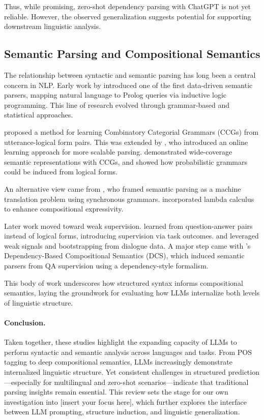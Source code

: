 Thus, while promising, zero-shot dependency parsing with ChatGPT is not yet reliable. However, the observed generalization suggests potential for supporting downstream linguistic analysis.

\subsection{Semantic Parsing and Compositional Semantics}

The relationship between syntactic and semantic parsing has long been a central concern in NLP. Early work by \citet{zelle1996} introduced one of the first data-driven semantic parsers, mapping natural language to Prolog queries via inductive logic programming. This line of research evolved through grammar-based and statistical approaches.

\citet{zettlemoyer2005} proposed a method for learning Combinatory Categorial Grammars (CCGs) from utterance-logical form pairs. This was extended by \citet{zettlemoyer2007online}, who introduced an online learning approach for more scalable parsing. \citet{bos2004} demonstrated wide-coverage semantic representations with CCGs, and \citet{kwiatkowski2010} showed how probabilistic grammars could be induced from logical forms.

An alternative view came from \citet{wong2006learning}, who framed semantic parsing as a machine translation problem using synchronous grammars. \citet{wong2007} incorporated lambda calculus to enhance compositional expressivity.

Later work moved toward weak supervision. \citet{clarke2010} learned from question-answer pairs instead of logical forms, introducing supervision via task outcomes. \citet{goldwasser2011confidence} and \citet{artzi2011} leveraged weak signals and bootstrapping from dialogue data. A major step came with \citet{liang2013learning}'s Dependency-Based Compositional Semantics (DCS), which induced semantic parsers from QA supervision using a dependency-style formalism.

This body of work underscores how structured syntax informs compositional semantics, laying the groundwork for evaluating how LLMs internalize both levels of linguistic structure.

\paragraph{Conclusion.}
Taken together, these studies highlight the expanding capacity of LLMs to perform syntactic and semantic analysis across languages and tasks. From POS tagging to deep compositional semantics, LLMs increasingly demonstrate internalized linguistic structure. Yet consistent challenges in structured prediction—especially for multilingual and zero-shot scenarios—indicate that traditional parsing insights remain essential. This review sets the stage for our own investigation into [insert your focus here], which further explores the interface between LLM prompting, structure induction, and linguistic generalization.

